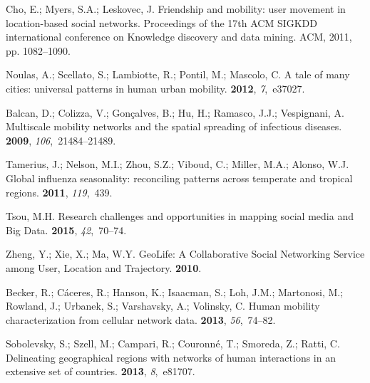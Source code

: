 \documentclass[ijgi,article,accept,moreauthors,pdftex,10pt,a4paper]{mdpi}
\theoremstyle{mdpi}
\newcounter{ex}
\newcounter{re}
\theoremstyle{mdpidefinition}
\begin{document}
\begin{thebibliography}{-------}
Cho, E.; Myers, S.A.; Leskovec, J.
\newblock Friendship and mobility: user movement in location-based social
  networks.
\newblock  Proceedings of the 17th ACM SIGKDD international conference on
  Knowledge discovery and data mining. ACM,  2011, pp. 1082--1090.

Noulas, A.; Scellato, S.; Lambiotte, R.; Pontil, M.; Mascolo, C.
\newblock A tale of many cities: universal patterns in human urban mobility.
 {\bf 2012}, {\em 7},~e37027.

Balcan, D.; Colizza, V.; Gon{\c{c}}alves, B.; Hu, H.; Ramasco, J.J.;
  Vespignani, A.
\newblock Multiscale mobility networks and the spatial spreading of infectious
  diseases.
 {\bf 2009},
  {\em 106},~21484--21489.

Tamerius, J.; Nelson, M.I.; Zhou, S.Z.; Viboud, C.; Miller, M.A.; Alonso, W.J.
\newblock Global influenza seasonality: reconciling patterns across temperate
  and tropical regions.
 {\bf 2011}, {\em 119},~439.

Tsou, M.H.
\newblock Research challenges and opportunities in mapping social media and Big
  Data.
 {\bf 2015}, {\em
  42},~70--74.

Zheng, Y.; Xie, X.; Ma, W.Y.
\newblock GeoLife: A Collaborative Social Networking Service among User,
  Location and Trajectory. {\bf 2010}.

Becker, R.; C{\'a}ceres, R.; Hanson, K.; Isaacman, S.; Loh, J.M.; Martonosi,
  M.; Rowland, J.; Urbanek, S.; Varshavsky, A.; Volinsky, C.
\newblock Human mobility characterization from cellular network data.
 {\bf 2013}, {\em 56},~74--82.

Sobolevsky, S.; Szell, M.; Campari, R.; Couronn{\'e}, T.; Smoreda, Z.; Ratti,
  C.
\newblock Delineating geographical regions with networks of human interactions
  in an extensive set of countries.
 {\bf 2013}, {\em 8},~e81707.


\end{thebibliography}
\end{document}
